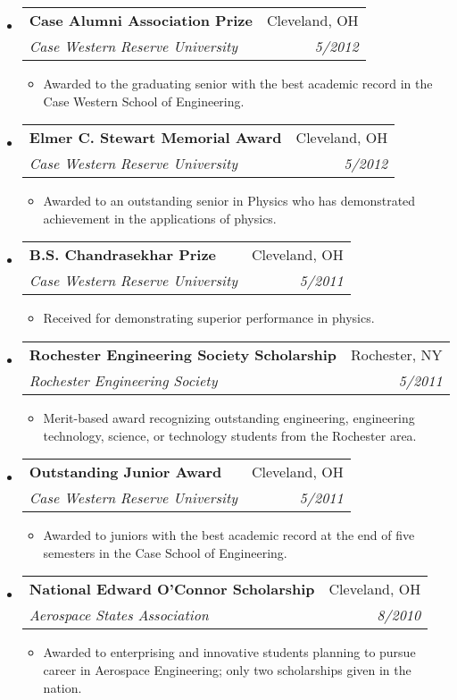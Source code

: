 \documentclass[letterpaper,11pt]{article}
\makeatletter
\newcommand{\resitem}[1]{\item #1 \vspace{-2pt}}
\newcommand{\ressubheading}[4]{\vspace{-14pt}
\begin{tabular*}{7.0in}{l@{\extracolsep{\fill}}r}
		\\
		\textbf{#1} & #2 \\
		\textit{#3} & \textit{#4} \\
\end{tabular*}\vspace{-6pt}}
\makeatother
\begin{document}
\begin{itemize}

\item
	\ressubheading{Case Alumni Association Prize}{Cleveland, OH}{Case Western Reserve University}{5/2012}
	\begin{itemize}
		\resitem{
	Awarded to the graduating senior with the best academic record in the Case Western School of Engineering.
		}
	\end{itemize}

\item
	\ressubheading{Elmer C. Stewart Memorial Award}{Cleveland, OH}{Case Western Reserve University}{5/2012}
	\begin{itemize}
		\resitem{
	Awarded to an outstanding senior in Physics who has demonstrated achievement in the applications of physics.
		}
	\end{itemize}

\item
	\ressubheading{B.S. Chandrasekhar Prize}{Cleveland, OH}{Case Western Reserve University}{5/2011}
	\begin{itemize}
		\resitem{
	Received for demonstrating superior performance in physics.
		}
	\end{itemize}


\item
	\ressubheading{Rochester Engineering Society Scholarship}{Rochester, NY}{Rochester Engineering Society}{5/2011}
	\begin{itemize}
		\resitem{
	Merit-based award recognizing outstanding engineering, engineering technology, science, or technology students from the Rochester area.
		}
	\end{itemize}

\item
	\ressubheading{Outstanding Junior Award}{Cleveland, OH}{Case Western Reserve University}{5/2011}
	\begin{itemize}
		\resitem{
	Awarded to juniors with the best academic record at the end of five semesters in the Case School of Engineering.
		}
	\end{itemize}
	
\item
	\ressubheading{National Edward O'Connor Scholarship}{Cleveland, OH}{Aerospace States Association}{8/2010}
	\begin{itemize}
		\resitem{
	Awarded to enterprising and innovative students planning to pursue career in Aerospace Engineering; only two scholarships given in the nation.
		}
	\end{itemize}		


\end{itemize}
\end{document}
